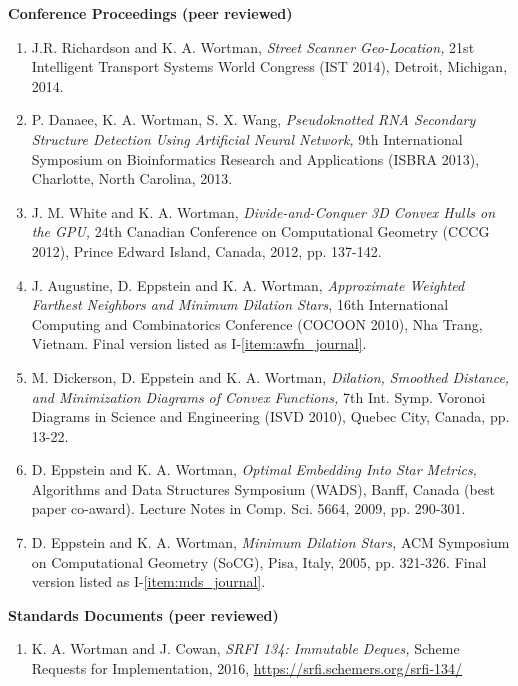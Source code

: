 \documentclass[11pt]{letter}
\begin{document}
\renewcommand{\labelenumi}{C-\arabic{enumi}.}
\textbf{Conference Proceedings (peer reviewed)}
\begin{enumerate}
\item \label{item:its14} J.R. Richardson and K. A. Wortman, \emph{Street Scanner Geo-Location,} 21st Intelligent Transport Systems World Congress (IST 2014), Detroit, Michigan, 2014.
\item \label{item:isbra13} P. Danaee, K. A. Wortman, S. X. Wang, \emph{Pseudoknotted RNA Secondary Structure Detection Using Artificial Neural Network,} 9th International Symposium on Bioinformatics Research and Applications (ISBRA 2013), Charlotte, North Carolina, 2013.
\item \label{item:cccg12} J. M. White and K. A. Wortman, \emph{Divide-and-Conquer 3D Convex Hulls on the GPU,} 24th Canadian Conference on Computational Geometry (CCCG 2012), Prince Edward Island, Canada, 2012, pp. 137-142.
\item \label{item:awfn_conference} J. Augustine, D. Eppstein and K. A. Wortman, \emph{Approximate Weighted Farthest Neighbors and Minimum Dilation Stars}, 16th International Computing and Combinatorics Conference (COCOON 2010), Nha Trang, Vietnam.  Final version listed as I-\ref{item:awfn_journal}.
\item M. Dickerson, D. Eppstein and K. A. Wortman, \emph{Dilation, Smoothed Distance, and Minimization Diagrams of Convex Functions,} 7th Int. Symp. Voronoi Diagrams in Science and Engineering (ISVD 2010), Quebec City, Canada, pp. 13-22.
\item \label{item:star_metrics} D. Eppstein and K. A. Wortman, \emph{Optimal Embedding Into Star Metrics,} Algorithms and Data Structures Symposium (WADS), Banff, Canada (best paper co-award).  Lecture Notes in Comp. Sci. 5664, 2009, pp. 290-301.
\item \label{item:mds_conference} D. Eppstein and K. A. Wortman, \emph{Minimum Dilation Stars,} ACM Symposium on Computational Geometry (SoCG), Pisa, Italy, 2005, pp. 321-326.  Final version listed as I-\ref{item:mds_journal}.
\end{enumerate}

\renewcommand{\labelenumi}{S-\arabic{enumi}.}
\textbf{Standards Documents (peer reviewed)}
\begin{enumerate}
\item \label{item:srfi134} K. A. Wortman and J. Cowan,
  \emph{SRFI 134: Immutable Deques,}
  Scheme Requests for Implementation, 2016,
  \url{https://srfi.schemers.org/srfi-134/}
\end{enumerate}
\end{document}
